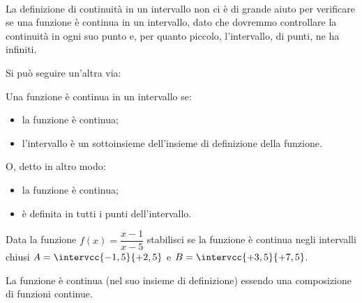 \begin{esempio}
~

\end{esempio}

La definizione di continuità in un intervallo non ci è di grande aiuto per 
verificare se una funzione è continua in un intervallo, dato che dovremmo 
controllare la continuità in ogni suo punto e, per quanto piccolo, 
l'intervallo, di punti, ne ha infiniti.

Si può seguire un'altra via: 

\begin{definizione}
Una funzione è continua in un intervallo se:
\begin{itemize} [noitemsep]
\item 
la funzione è continua; %
\item 
l'intervallo è un sottoinsieme dell'insieme di definizione della funzione.
\end{itemize}
O, detto in altro modo: 
\begin{itemize} [noitemsep]
\item 
la funzione è continua; %
\item 
è definita in tutti i punti dell'intervallo.
\end{itemize}
\end{definizione}

\begin{esempio}
Data la funzione \(f(x) = \dfrac{x-1}{x-5}\) stabilisci se la funzione è 
continua negli intervalli chiusi \(A=\intervcc{-1,5}{+2,5}\) e 
\(B=\intervcc{+3,5}{+7,5}\).

La funzione è continua (nel suo insieme di definizione) essendo una 
composizione di funzioni continue.

\end{esempio}



